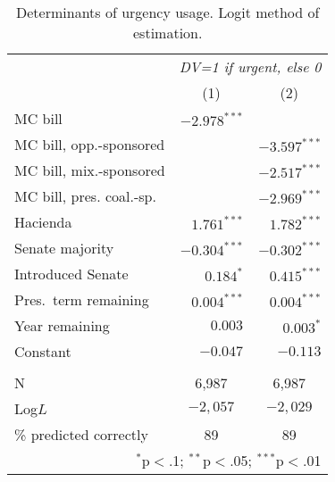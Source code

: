 \documentclass[letter,12pt]{article}
\begin{document}
\begin{table}
\centering
\begin{tabular}{lrr} 
 & \multicolumn{2}{c}{\textit{DV=1 if urgent, else 0}} \\ 
 & \multicolumn{1}{c}{(1)} & \multicolumn{1}{c}{(2)}\\ 
\hline
 MC bill & $-2.978^{***}$ &  \\ 
 MC bill, opp.-sponsored &  & $-3.597^{***}$ \\ 
 MC bill, mix.-sponsored &  & $-2.517^{***}$ \\ 
 MC bill, pres. coal.-sp. &  & $-2.969^{***}$ \\ 
 Hacienda & $1.761^{***}$ & $1.782^{***}$ \\ 
 Senate majority & $-0.304^{***}$ & $-0.302^{***}$ \\ 
 Introduced Senate & $0.184^{*}$ & $0.415^{***}$ \\ 
 Pres.~term remaining & $0.004^{***}$ & $0.004^{***}$ \\ 
 Year remaining  & $0.003$ & $0.003^{*}$ \\ 
 Constant & $-0.047$ & $-0.113$ \\ 
\hline \\[-1.8ex] 
N & \multicolumn{1}{c}{6,987} & \multicolumn{1}{c}{6,987} \\ 
Log$L$ & \multicolumn{1}{c}{$-2,057$} & \multicolumn{1}{c}{$-2,029$} \\ 
\% predicted correctly & \multicolumn{1}{c}{89} & \multicolumn{1}{c}{89} \\ \hline 
\multicolumn{3}{r}{\footnotesize{$^{*}$p$<$.1; $^{**}$p$<$.05; $^{***}$p$<$.01}} \\ 
\end{tabular} 
\caption{Determinants of urgency usage. Logit method of estimation.}\label{t:logit}
\end{table}
\end{document}

